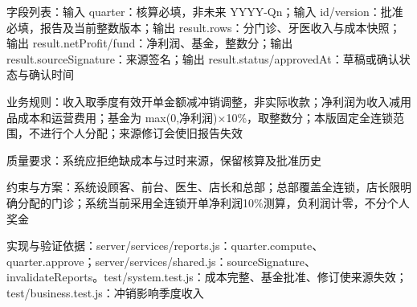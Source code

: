 \documentclass[UTF8,12pt,a4paper,fontset=none]{ctexart}
\begin{document}
字段列表：输入 quarter：核算必填，非未来 YYYY-Qn；输入 id/\allowbreak{}version：批准必填，报告及当前整数版本；输出 result.\allowbreak{}rows：分门诊、牙医收入与成本快照；输出 result.\allowbreak{}netProfit/\allowbreak{}fund：净利润、基金，整数分；输出 result.\allowbreak{}sourceSignature：来源签名；输出 result.\allowbreak{}status/\allowbreak{}approvedAt：草稿或确认状态与确认时间\par
业务规则：收入取季度有效开单金额减冲销调整，非实际收款；净利润为收入减用品成本和运营费用；基金为 max(0,\allowbreak{}净利润)×10\%，取整数分；本版固定全连锁范围，不进行个人分配；来源修订会使旧报告失效\par
质量要求：系统应拒绝缺成本与过时来源，保留核算及批准历史\par
约束与方案：系统设顾客、前台、医生、店长和总部；总部覆盖全连锁，店长限明确分配的门诊；系统当前采用全连锁开单净利润10\%测算，负利润计零，不分个人奖金\par
实现与验证依据：server/\allowbreak{}services/\allowbreak{}reports.\allowbreak{}js：quarter.\allowbreak{}compute、quarter.\allowbreak{}approve；server/\allowbreak{}services/\allowbreak{}shared.\allowbreak{}js：sourceSignature、invalidateReports。test/\allowbreak{}system.\allowbreak{}test.\allowbreak{}js：成本完整、基金批准、修订使来源失效；test/\allowbreak{}business.\allowbreak{}test.\allowbreak{}js：冲销影响季度收入\par
{}
\end{document}
